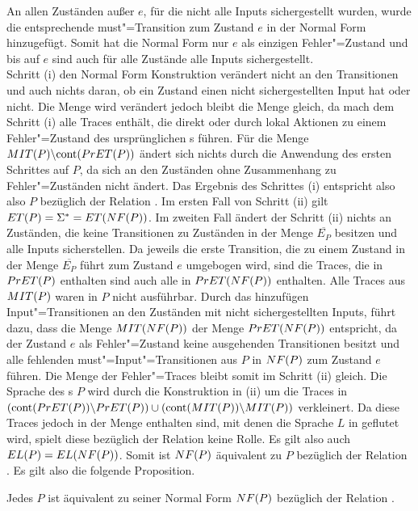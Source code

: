 An allen Zuständen außer $e$, für die nicht alle Inputs sichergestellt wurden,
wurde die entsprechende must"=Transition zum Zustand $e$ in der Normal Form
hinzugefügt. Somit hat die Normal Form nur $e$ als einzigen Fehler"=Zustand und
bis auf $e$ sind auch für alle Zustände alle Inputs sichergestellt.\\
Schritt (i) den Normal Form Konstruktion verändert nicht an den Transitionen
und auch nichts daran, ob ein Zustand einen nicht sichergestellten Input hat
oder nicht. Die Menge \StET{} wird verändert jedoch bleibt die Menge \PrET{}
gleich, da \StET{} mach dem Schritt (i) alle Traces enthält, die direkt oder
durch lokal Aktionen zu einem Fehler"=Zustand des ursprünglichen \MEIO{}s
führen. Für die Menge $MIT (P)\backslash\mathrm{cont} (PrET (P))$ ändert sich nichts
durch die Anwendung des ersten Schrittes auf $P$, da sich an den Zuständen ohne
Zusammenhang zu Fehler"=Zuständen nicht ändert. Das Ergebnis des Schrittes (i)
entspricht also also $P$ bezüglich der Relation \ERel{}. Im ersten Fall von
Schritt (ii) gilt $ET (P) = \Sigma ^* = ET (NF (P))$. Im zweiten Fall ändert
der Schritt (ii) nichts an Zuständen, die keine Transitionen zu Zuständen in
der Menge $\overline{E _P}$ besitzen und alle Inputs sicherstellen. Da jeweils
die erste Transition, die zu einem Zustand in der Menge $\overline{E _P}$ führt
zum Zustand $e$ umgebogen wird, sind die Traces, die in $PrET (P)$ enthalten
sind auch alle in $PrET (NF (P))$ enthalten. Alle Traces aus $MIT (P)$ waren
in $P$ nicht ausführbar. Durch das hinzufügen Input"=Transitionen an den
Zuständen mit nicht sichergestellten Inputs, führt dazu, dass die Menge $MIT
(NF (P))$ der Menge $PrET (NF (P))$ entspricht, da der Zustand $e$ als
Fehler"=Zustand keine ausgehenden Transitionen besitzt und alle fehlenden
must"=Input"=Transitionen aus $P$ in $NF (P)$ zum Zustand $e$ führen. Die Menge
der Fehler"=Traces \ET{} bleibt somit im Schritt (ii) gleich. Die Sprache des
\MEIO{}s $P$ wird durch die Konstruktion in (ii) um die Traces in $(\mathrm{cont}
(PrET (P))\backslash PrET (P)) \cup (\mathrm{cont} (MIT (P))\backslash MIT (P))$
verkleinert. Da diese Traces jedoch in der Menge \ET{} enthalten sind, mit
denen die Sprache $L$ in \EL{} geflutet wird, spielt diese bezüglich der
Relation \ERel{} keine Rolle. Es gilt also auch $EL (P) = EL (NF (P))$.
Somit ist $NF (P)$ äquivalent zu $P$ bezüglich der Relation \ERel{}. Es gilt
also die folgende Proposition.

\begin{Prop}
  Jedes \MEIO{} $P$ ist äquivalent zu seiner Normal Form $NF (P)$ bezüglich
  der Relation \ERel{}.
\end{Prop}

